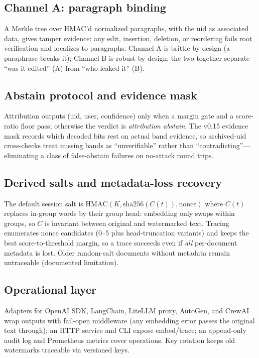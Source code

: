 \subsection{Channel A: paragraph binding}
A Merkle tree over HMAC'd normalized paragraphs, with the uid as associated
data, gives tamper evidence: any edit, insertion, deletion, or reordering
fails root verification and localizes to paragraphs. Channel A is brittle
by design (a paraphrase breaks it); Channel B is robust by design; the two
together separate ``was it edited'' (A) from ``who leaked it'' (B).

\subsection{Abstain protocol and evidence mask}
Attribution outputs (uid, user, confidence) only when a margin gate and a
score-ratio floor pass; otherwise the verdict is \emph{attribution
abstain}. The v0.15 evidence mask records which decoded bits rest on actual
band evidence, so archived-uid cross-checks treat missing bands as
``unverifiable'' rather than ``contradicting''---eliminating a class of
false-abstain failures on no-attack round trips.

\subsection{Derived salts and metadata-loss recovery}
The default session salt is $\mathrm{HMAC}(K, \mathrm{sha256}(C(t)),
\mathrm{nonce})$ where $C(t)$ replaces in-group words by their group head:
embedding only swaps within groups, so $C$ is invariant between original
and watermarked text. Tracing enumerates nonce candidates (0--5 plus
head-truncation variants) and keeps the best score-to-threshold margin,
so a trace succeeds even if \emph{all} per-document metadata is lost. Older
random-salt documents without metadata remain untraceable (documented
limitation).

\subsection{Operational layer}
Adapters for OpenAI SDK, LangChain, LiteLLM proxy, AutoGen, and CrewAI
wrap outputs with fail-open middleware (any embedding error passes the
original text through); an HTTP service and CLI expose embed/trace; an
append-only audit log and Prometheus metrics cover operations. Key
rotation keeps old watermarks traceable via versioned keys.
